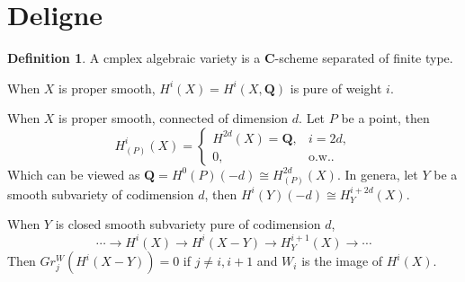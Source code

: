 \documentclass[leqno]{amsart}
\newcommand{\Q}{{\mathbf{Q}}}
\newcommand{\C}{\mathbf C}
\newcommand{\1}{\mathbf{1}}
\theoremstyle{definition}
\newtheorem{defn}[thm]{Definition}
\theoremstyle{remark}
\begin{document}
\section{Deligne}

\begin{defn}
	A cmplex algebraic variety is a $\C$-scheme
	separated of finite type.
\end{defn}

When $X$ is proper smooth,
 $H^i(X)=H^i(X,\Q)$ is pure of weight  $i$.

When  $X$ is proper smooth, connected of dimension  $d$.
Let $P$ be a point, then
 \[
	H^{i}_{(P)}(X)=
	\begin{cases}
		H^{2d}(X)=\Q, & i=2d,\\
		0, & \text{o.w.}.
	\end{cases}
\]
Which can be viewed as
$\Q=H^0(P)(-d)\cong H^{2d}_{(P)}(X)$.
In genera, let $Y$ be a smooth subvariety of codimension  $d$,
then  $H^i(Y)(-d)\cong H^{i+2d}_Y(X)$.

When $Y$ is closed smooth subvariety
pure of codimension  $d$,
 \[
	\cdots\to H^i(X)\to H^i(X-Y)\to H^{i+1}_Y(X)\to \cdots
\]
Then $Gr^W_j(H^i(X-Y))=0$ if  $j\neq i,i+1$
and  $W_i$ is the image of  $H^i(X)$.

\end{document}

